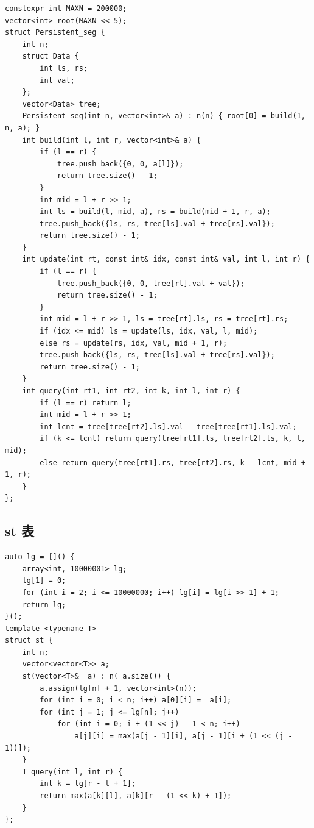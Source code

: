 \documentclass[UTF8]{ctexart}
\begin{document}
\begin{sloppypar}
\begin{lstlisting}[style=cpp]
constexpr int MAXN = 200000;
vector<int> root(MAXN << 5);
struct Persistent_seg {
    int n;
    struct Data {
        int ls, rs;
        int val;
    };
    vector<Data> tree;
    Persistent_seg(int n, vector<int>& a) : n(n) { root[0] = build(1, n, a); }
    int build(int l, int r, vector<int>& a) {
        if (l == r) {
            tree.push_back({0, 0, a[l]});
            return tree.size() - 1;
        }
        int mid = l + r >> 1;
        int ls = build(l, mid, a), rs = build(mid + 1, r, a);
        tree.push_back({ls, rs, tree[ls].val + tree[rs].val});
        return tree.size() - 1;
    }
    int update(int rt, const int& idx, const int& val, int l, int r) {
        if (l == r) {
            tree.push_back({0, 0, tree[rt].val + val});
            return tree.size() - 1;
        }
        int mid = l + r >> 1, ls = tree[rt].ls, rs = tree[rt].rs;
        if (idx <= mid) ls = update(ls, idx, val, l, mid);
        else rs = update(rs, idx, val, mid + 1, r);
        tree.push_back({ls, rs, tree[ls].val + tree[rs].val});
        return tree.size() - 1;
    }
    int query(int rt1, int rt2, int k, int l, int r) {
        if (l == r) return l;
        int mid = l + r >> 1;
        int lcnt = tree[tree[rt2].ls].val - tree[tree[rt1].ls].val;
        if (k <= lcnt) return query(tree[rt1].ls, tree[rt2].ls, k, l, mid);
        else return query(tree[rt1].rs, tree[rt2].rs, k - lcnt, mid + 1, r);
    }
};
\end{lstlisting}

\subsection{st 表}

\begin{lstlisting}[style=cpp]
auto lg = []() {
    array<int, 10000001> lg;
    lg[1] = 0;
    for (int i = 2; i <= 10000000; i++) lg[i] = lg[i >> 1] + 1;
    return lg;
}();
template <typename T>
struct st {
    int n;
    vector<vector<T>> a;
    st(vector<T>& _a) : n(_a.size()) {
        a.assign(lg[n] + 1, vector<int>(n));
        for (int i = 0; i < n; i++) a[0][i] = _a[i];
        for (int j = 1; j <= lg[n]; j++)
            for (int i = 0; i + (1 << j) - 1 < n; i++)
                a[j][i] = max(a[j - 1][i], a[j - 1][i + (1 << (j - 1))]);
    }
    T query(int l, int r) {
        int k = lg[r - l + 1];
        return max(a[k][l], a[k][r - (1 << k) + 1]);
    }
};
\end{lstlisting}


\end{sloppypar}
\end{document}
